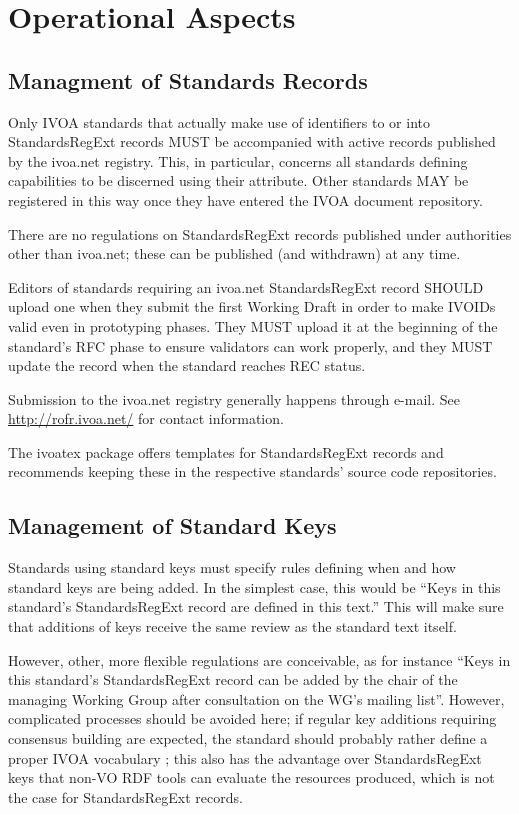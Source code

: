 \documentclass[11pt,a4paper]{ivoa}
\begin{document}
\section{Operational Aspects}
\label{sect:operations}

\subsection{Managment of Standards Records}

Only IVOA standards that actually make use of identifiers to or into
StandardsRegExt records MUST be accompanied with active records
published by the ivoa.net registry.  This, in particular, concerns all
standards defining capabilities to be discerned using their
 attribute.  Other standards MAY be registered in this
way once they have entered the IVOA document repository.

There are no regulations on StandardsRegExt records published under
authorities other than ivoa.net; these can be published (and withdrawn)
at any time.

Editors of standards requiring an ivoa.net StandardsRegExt record SHOULD
upload one when they submit the first Working Draft in order to make
IVOIDs valid even in prototyping phases.  They MUST upload it at the
beginning of the standard's RFC phase to ensure validators can work
properly, and they MUST update the record when the standard reaches REC
status.

Submission to the ivoa.net registry generally happens through e-mail.
See \url{http://rofr.ivoa.net/} for contact information.

The ivoatex package \citep{ivoatexDoc} offers templates for
StandardsRegExt records and recommends keeping these in the respective
standards' source code repositories.


\subsection{Management of Standard Keys}

Standards using standard keys must specify rules defining when and how
standard  keys are being added.  In the simplest case, this would be
``Keys in this standard's StandardsRegExt record are defined in this
text.''  This will make sure that additions of keys receive the same
review as the standard text itself.

However, other, more flexible regulations are conceivable, as for
instance ``Keys in this standard's StandardsRegExt record can be added
by the chair of the managing Working Group after consultation on the
WG's mailing list''.  However, complicated processes should be avoided
here; if regular key additions requiring consensus building are
expected, the standard should probably rather define a proper IVOA
vocabulary \citep{2021ivoa.spec.0525D}; this also has the advantage over
StandardsRegExt keys that non-VO RDF tools can evaluate the resources
produced, which is not the case for StandardsRegExt records.
\end{document}
